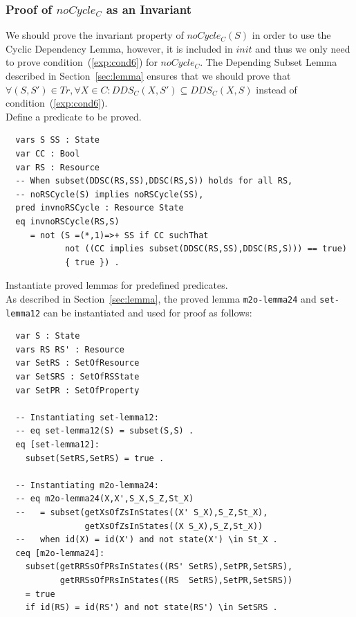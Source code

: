 \documentclass[12pt]{report}
\begin{document}
\subsubsection*{Proof of $noCycle_C$ as an Invariant}
We should prove the invariant property of $noCycle_C(S)$ in order to
use the Cyclic Dependency Lemma, however, it is included in $init$ and
thus we only need to prove condition~(\ref{exp:cond6}) for $noCycle_C$.
The Depending Subset Lemma described in Section~\ref{sec:lemma}
ensures that we should prove that $\forall (S,S') \in \mathit{Tr}, \forall X\in
C:\mathit{DDS_C}(X,S')\subseteq \mathit{DDS_C}(X,S)$ instead of
condition~(\ref{exp:cond6}).\\

 Define a predicate to be proved. 
\small
\begin{verbatim}
  vars S SS : State
  var CC : Bool
  var RS : Resource
  -- When subset(DDSC(RS,SS),DDSC(RS,S)) holds for all RS,
  -- noRSCycle(S) implies noRSCycle(SS),
  pred invnoRSCycle : Resource State
  eq invnoRSCycle(RS,S) 
     = not (S =(*,1)=>+ SS if CC suchThat
            not ((CC implies subset(DDSC(RS,SS),DDSC(RS,S))) == true)
            { true }) .
\end{verbatim}
\normalsize

 Instantiate proved lemmas for predefined
predicates. \\ As described in Section~\ref{sec:lemma}, the proved
lemma {\tt m2o-lemma24} and {\tt set-lemma12} can be instantiated and
used for proof as follows:
\small
\begin{verbatim}
  var S : State
  vars RS RS' : Resource
  var SetRS : SetOfResource
  var SetSRS : SetOfRSState
  var SetPR : SetOfProperty

  -- Instantiating set-lemma12:
  -- eq set-lemma12(S) = subset(S,S) .
  eq [set-lemma12]:
    subset(SetRS,SetRS) = true .

  -- Instantiating m2o-lemma24:
  -- eq m2o-lemma24(X,X',S_X,S_Z,St_X)
  --   = subset(getXsOfZsInStates((X' S_X),S_Z,St_X),
                getXsOfZsInStates((X S_X),S_Z,St_X))
  --   when id(X) = id(X') and not state(X') \in St_X .
  ceq [m2o-lemma24]:
    subset(getRRSsOfPRsInStates((RS' SetRS),SetPR,SetSRS),
           getRRSsOfPRsInStates((RS  SetRS),SetPR,SetSRS))
    = true
    if id(RS) = id(RS') and not state(RS') \in SetSRS .
\end{verbatim}
\normalsize
\end{document}
